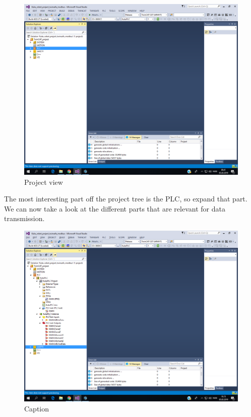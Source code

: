 \documentclass{article}
\begin{document}
\begin{figure}[!h]
    \centering
    \includegraphics[width=\textwidth]{pictures/TC3_project_view.png}
    \caption{Project view}
    \label{fig:my_label2}
\end{figure}

The most interesting part off the project tree is the PLC, so expand that part. 
\newpage
We can now take a look at the different parts that are relevant for data transmission.

\begin{figure}[!h]
    \centering
    \includegraphics[width=\textwidth]{pictures/TC3_PLC_expanded.png}
    \caption{Caption}
    \label{fig:my_label}
\end{figure}
\end{document}
